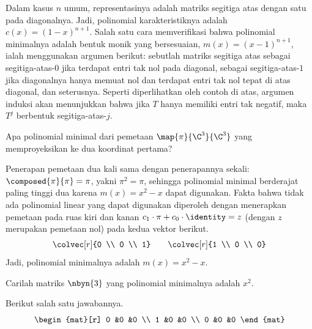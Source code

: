 \begin{exercises}
\begin{answer}
      Dalam kasus $n$ umum, representasinya adalah matriks segitiga
      atas dengan satu pada diagonalnya.
       Jadi, polinomial karakteristiknya adalah $c(x)=(1-x)^{n+1}$.
       Salah satu cara memverifikasi bahwa polinomial minimalnya adalah bentuk
       monik yang bersesuaian, $m(x)=(x-1)^{n+1}$, ialah menggunakan argumen berikut:
      sebutlah matriks segitiga atas sebagai segitiga-atas-$0$ jika
      terdapat entri tak nol pada diagonal, sebagai segitiga-atas-$1$ jika
      diagonalnya hanya memuat nol dan terdapat entri tak nol tepat di atas
      diagonal, dan seterusnya.
      Seperti diperlihatkan oleh contoh di atas, argumen induksi akan
      menunjukkan bahwa jika $T$ hanya memiliki entri tak negatif,
      maka $T^j$ berbentuk segitiga-atas-$j$.
    \end{answer}
   \item 
     Apa polinomial minimal dari
     pemetaan \( \map{\pi}{\C^3}{\C^3} \)
     yang memproyeksikan ke dua koordinat pertama?
      \begin{answer}
        Penerapan pemetaan dua kali sama dengan penerapannya sekali:~$\composed{\pi}{\pi}=\pi$,
        yakni $\pi^2=\pi$, sehingga polinomial minimal berderajat
        paling tinggi dua karena \( m(x)=x^2-x \) dapat digunakan.
        Fakta bahwa tidak ada polinomial linear yang dapat digunakan diperoleh dengan menerapkan
        pemetaan pada ruas kiri dan kanan
        $c_1\cdot \pi+c_0\cdot \identity=z$ (dengan $z$ merupakan pemetaan nol)
        pada kedua vektor berikut.
        \begin{equation*}
          \colvec[r]{0 \\ 0 \\ 1}
          \qquad
          \colvec[r]{1 \\ 0 \\ 0}
        \end{equation*}
        Jadi, polinomial minimalnya adalah $m(x)=x^2-x$.
      \end{answer}
   \item 
     Carilah matriks \( \nbyn{3} \) yang polinomial
     minimalnya adalah \( x^2 \).
     \begin{answer}
        Berikut salah satu jawabannya.
        \begin{equation*}
            \begin{mat}[r]
              0  &0  &0  \\
              1  &0  &0  \\
              0  &0  &0

\end{mat}
\end{equation*}
\end{answer}
\end{exercises}
